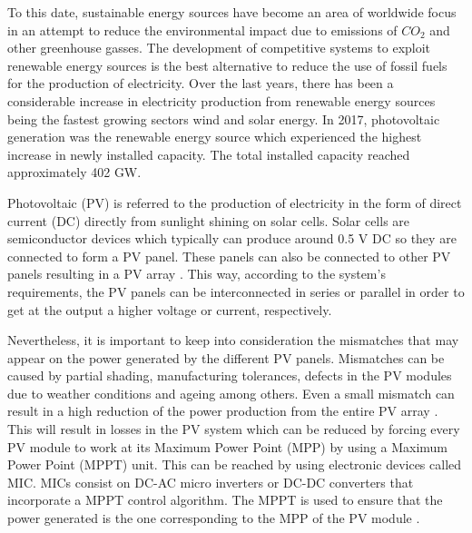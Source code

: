To this date, sustainable energy sources have become an area of worldwide focus in an attempt to reduce the environmental impact due to emissions of $CO_{2}$ and other greenhouse gasses. The development of competitive systems to exploit renewable energy sources is the best alternative to reduce the use of fossil fuels for the production of electricity. Over the last years, there has been a considerable increase in electricity production from renewable energy sources being the fastest growing sectors wind and solar energy. In 2017, photovoltaic generation was the renewable energy source which experienced the highest increase in newly installed capacity. The total installed capacity reached approximately 402 GW\cite{global}. 

Photovoltaic (PV) is referred to the production of electricity in the form of direct current (DC) directly from sunlight shining on solar cells. Solar cells are semiconductor devices which typically can produce around 0.5 V DC so they are connected to form a PV panel. These panels can also be connected to other PV panels resulting in a PV array \cite{handbook}. This way, according to the system's requirements, the PV panels can be interconnected in series or parallel in order to get at the output a higher voltage or current, respectively.

Nevertheless, it is important to keep into consideration the mismatches that may appear on the power generated by the different PV panels.  Mismatches can be caused by partial shading, manufacturing tolerances, defects in the PV modules due to weather conditions and ageing among others. Even a small mismatch can result in a high reduction of the power production from the entire PV array \cite{MPPmismatch}. This will result in losses in the PV system which can be reduced by forcing every PV module to work at its Maximum Power Point (MPP) by using a Maximum Power Point (MPPT) unit. This can be reached by using electronic devices called MIC. MICs consist on DC-AC micro inverters or DC-DC converters that incorporate a MPPT control algorithm. The MPPT is used to ensure that the power generated is the one corresponding to the MPP of the PV module \cite{MPPmismatch}.